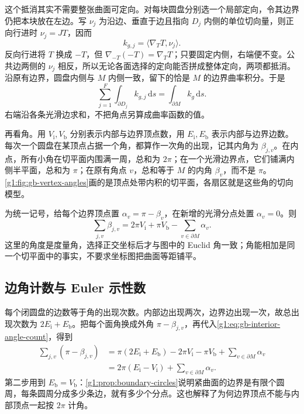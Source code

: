 \ProseParagraphBreak

这个抵消其实不需要整张曲面可定向。对每块圆盘分别选一个局部定向，令其边界仍把本块放在左边。写 \(\nu_j\) 为沿边、垂直于边且指向 \(D_j\) 内侧的单位切向量，则正向行进时 \(\nu_j=JT\)，因而
\[
	k_{g,j}=\langle\nabla_TT,\nu_j\rangle.
\]
反向行进将 \(T\) 换成 \(-T\)，但 \(\nabla_{-T}(-T)=\nabla_TT\)；只要固定内侧，右端便不变。公共边两侧的 \(\nu_j\) 相反，所以无论各面选择的定向能否拼成整体定向，两项都抵消。沿原有边界，圆盘内侧与 \(M\) 内侧一致，留下的恰是 \(M\) 的边界曲率积分。于是
\begin{equation}\label{g1:eq:gb-edge-cancellation}
	\sum_{j=1}^F\int_{\partial D_j}k_{g,j}\,\mathrm{d}s
	=\int_{\partial M}k_g\,\mathrm{d}s.
\end{equation}
右端沿各条光滑边求和，不把角点另算成曲率函数的值。

\ProseParagraphBreak

再看角。用 \(V_{\mathrm i},V_{\mathrm b}\) 分别表示内部与边界顶点数，用 \(E_{\mathrm i},E_{\mathrm b}\) 表示内部与边界边数。每次一个圆盘在某顶点占据一个角，都算作一次角的出现，记其内角为 \(\beta_{j,v}\)。在内点，所有小角在切平面内围满一周，总和为 \(2\pi\)；在一个光滑边界点，它们铺满内侧半平面，总和为 \(\pi\)；在原有角点 \(v\)，总和等于 \(M\) 的内角 \(\beta_v\)，而不是 \(\pi\)。\cref{g1:fig:gb-vertex-angles}画的是顶点处带内积的切平面，各扇区就是这些角的切向模型。



为统一记号，给每个边界顶点置 \(\alpha_v=\pi-\beta_v\)，在新增的光滑分点处置 \(\alpha_v=0\)。则
\begin{equation}\label{g1:eq:gb-interior-angle-count}
	\sum_{j,v}\beta_{j,v}
	=2\pi V_{\mathrm i}+\pi V_{\mathrm b}
	-\sum_{v\in\partial M}\alpha_v.
\end{equation}
这里的角度是度量角，选择正交坐标后才与图中的 Euclid 角一致；角能相加是同一个切平面中的事实，不要求坐标图把曲面等距铺平。

\subsection{边角计数与 Euler 示性数}
\label{g1:subsec:0904:03}

每个闭圆盘的边数等于角的出现次数。内部边出现两次，边界边出现一次，故总出现次数为 \(2E_{\mathrm i}+E_{\mathrm b}\)。把每个面角换成外角 \(\pi-\beta_{j,v}\)，再代入\eqref{g1:eq:gb-interior-angle-count}，得到
\begin{align*}
	\sum_{j,v}(\pi-\beta_{j,v})
	&=\pi(2E_{\mathrm i}+E_{\mathrm b})-2\pi V_{\mathrm i}-\pi V_{\mathrm b}
	+\sum_{v\in\partial M}\alpha_v\\
	&=2\pi(E_{\mathrm i}-V_{\mathrm i})+\sum_{v\in\partial M}\alpha_v.
\end{align*}
第二步用到 \(E_{\mathrm b}=V_{\mathrm b}\)：\cref{g1:prop:boundary-circles}说明紧曲面的边界是有限个圆周，每条圆周分成多少条边，就有多少个分点。这也解释了为何边界顶点不能与内部顶点一起按 \(2\pi\) 计角。

